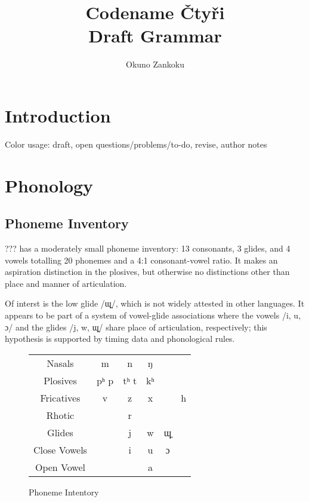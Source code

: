\documentclass[12pt]{book} %
\title{Codename Čtyři \\ {\Large Draft Grammar}}
\author{Okuno Zankoku}
\begin{document}
\maketitle

\tableofcontents





\chapter{Introduction}

Color usage: {\color{orange}draft}, {\color{red}open questions/problems/to-do}, {\color{cyan}revise}, {\color{green} author notes}





\chapter{Phonology}

\section{Phoneme Inventory}
??? has a moderately small phoneme inventory: 13 consonants, 3 glides, and 4 vowels totalling 20 phonemes and a 4:1 consonant-vowel ratio.
It makes an aspiration distinction in the plosives, but otherwise no distinctions other than place and manner of articulation.

Of interst is the low glide /ɰ̠/, which is not widely attested in other languages.
It appears to be part of a system of vowel-glide associations where the vowels /i, u, ɔ/ and the glides /j, w, ɰ̠/ share place of articulation, respectively; this hypothesis is supported by timing data and phonological rules.

\begin{figure}[H]
\centering
    \begin{tabular}{cccccc}
    Nasals      &   m   & n     & ŋ             \\
    Plosives        &   pʰ p    & tʰ t  & kʰ        \\
    Fricatives  &   v   & z     & x &   & h \\
    Rhotic      &       & r                 \\
    Glides      &       & j     & w & ɰ̠        \\
    Close Vowels    &       & i     & u & ɔ     \\
    Open Vowel  &       &       & a &       \\
    \end{tabular}
\caption{Phoneme Intentory}\label{t:phonemes}
\end{figure}
\end{document}
